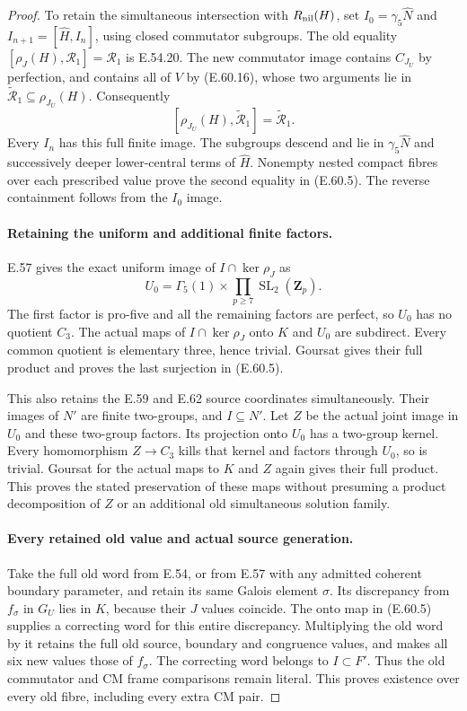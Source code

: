\begin{proof}
To retain the simultaneous intersection with
$R_{\rm nil}(H)$, set $I_0=\gamma_5\widehat N$ and
$I_{n+1}=[\widehat H,I_n]$, using closed commutator
subgroups. The old equality
$[\rho_J(H),\mathcal R_1]=\mathcal R_1$ is E.54.20.
The new commutator image contains $C_{J_U}$ by
perfection, and contains all of $V$ by
\textup{(E.60.16)}, whose two arguments lie in
$\widetilde{\mathcal R}_1\subseteq\rho_{J_U}(H)$.
Consequently
\[
 [\rho_{J_U}(H),\widetilde{\mathcal R}_1]
                              =\widetilde{\mathcal R}_1.
 \tag{E.60.17}
\]
Every $I_n$ has this full finite image. The subgroups
descend and lie in $\gamma_5\widehat N$ and successively
deeper lower-central terms of $\widehat H$.
Nonempty nested compact fibres over each prescribed
value prove the second equality in \textup{(E.60.5)}.
The reverse containment follows from the $I_0$ image.

\paragraph{Retaining the uniform and additional finite factors.}
E.57 gives the exact uniform image of
$I\cap\ker\rho_J$ as
\[
              U_0=\Gamma_5(1)\times
                   \prod_{p\ge7}\operatorname{SL}_2(\mathbf Z_p).
 \tag{E.60.18}
\]
The first factor is pro-five and all the remaining
factors are perfect, so $U_0$ has no quotient $C_3$.
The actual maps of $I\cap\ker\rho_J$ onto $K$ and
$U_0$ are subdirect. Every common quotient is elementary
three, hence trivial. Goursat gives their full product
and proves the last surjection in \textup{(E.60.5)}.

This also retains the E.59 and E.62 source coordinates
simultaneously. Their images of $N'$ are finite
two-groups, and $I\subseteq N'$.
Let $Z$ be the actual joint image in $U_0$ and these
two-group factors. Its projection onto $U_0$ has a
two-group kernel. Every homomorphism $Z\to C_3$ kills
that kernel and factors through $U_0$, so is trivial.
Goursat for the actual maps to $K$ and $Z$ again gives
their full product. This proves the stated preservation
of these maps without presuming a product decomposition
of $Z$ or an additional old simultaneous solution family.

\paragraph{Every retained old value and actual source generation.}
Take the full old word from E.54, or from E.57 with
any admitted coherent boundary parameter, and retain
its same Galois element $\sigma$.
Its discrepancy from $f_\sigma$ in $G_U$ lies in $K$,
because their $J$ values coincide. The onto map in
\textup{(E.60.5)} supplies a correcting word for this
entire discrepancy. Multiplying the old word by it
retains the full old source, boundary and congruence
values, and makes all six new values those of
$f_\sigma$. The correcting word belongs to $I\subset F'$.
Thus the old commutator and CM frame comparisons remain
literal. This proves existence over every old fibre,
including every extra CM pair.


\end{proof}
